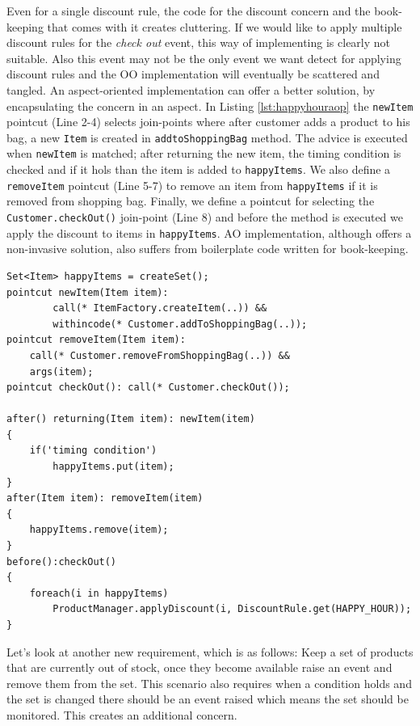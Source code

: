 Even for a single discount rule, the code for the discount concern and the book-keeping that comes with it creates cluttering. If we would like to apply multiple discount rules for the \emph{check out} event, this way of implementing is clearly not suitable. Also this event may not be the only event we want detect for applying discount rules and the OO implementation will eventually be scattered and tangled. An aspect-oriented implementation can offer a better solution, by encapsulating the concern in an aspect. In Listing \ref{lst:happyhouraop} the \texttt{newItem} pointcut (Line 2-4) selects join-points where after customer adds a product to his bag, a new \texttt{Item} is created in \texttt{addtoShoppingBag} method. The advice is executed when \texttt{newItem} is matched; after returning the new item, the timing condition is checked and if it hols than the item is added to \texttt{happyItems}. We also define a \texttt{removeItem} pointcut (Line 5-7)  to remove an item from \texttt{happyItems} if it is removed from shopping bag. Finally, we define a pointcut for selecting the \texttt{Customer.checkOut()} join-point (Line 8) and before the method is executed we apply the discount to items in \texttt{happyItems}. AO implementation, although offers a non-invasive solution, also suffers from boilerplate code written for book-keeping. 

\begin{lstlisting}[float, caption={An Aspectj implementation of Happy-hour discount rule}, label={lst:happyhouraop}]
Set<Item> happyItems = createSet();
pointcut newItem(Item item): 
		call(* ItemFactory.createItem(..)) && 
		withincode(* Customer.addToShoppingBag(..));
pointcut removeItem(Item item): 
	call(* Customer.removeFromShoppingBag(..)) && 
	args(item);
pointcut checkOut(): call(* Customer.checkOut());

after() returning(Item item): newItem(item)
{
	if('timing condition')
		happyItems.put(item);
}
after(Item item): removeItem(item)
{
	happyItems.remove(item);
}
before():checkOut()
{
	foreach(i in happyItems)
		ProductManager.applyDiscount(i, DiscountRule.get(HAPPY_HOUR));
}
\end{lstlisting}

Let's look at another new requirement, which is as follows: \textsf{Keep a set of products that are currently out of stock,  once they become available raise an event and remove them from the set}. This scenario also requires when a condition holds and the set is changed there should be an event raised which means the set should be monitored. This creates an additional concern. 

